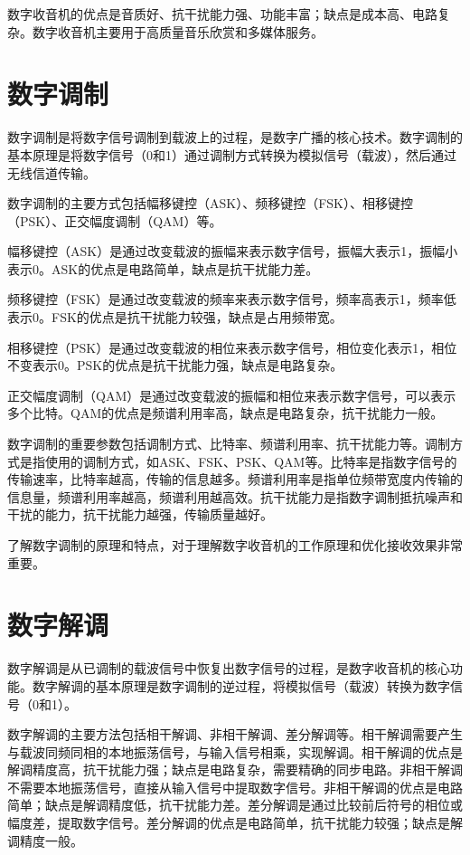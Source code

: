 \documentclass[12pt,UTF8]{ctexbook}
\begin{document}
数字收音机的优点是音质好、抗干扰能力强、功能丰富；缺点是成本高、电路复杂。数字收音机主要用于高质量音乐欣赏和多媒体服务。

\section{数字调制}

数字调制是将数字信号调制到载波上的过程，是数字广播的核心技术。数字调制的基本原理是将数字信号（0和1）通过调制方式转换为模拟信号（载波），然后通过无线信道传输。

数字调制的主要方式包括幅移键控（ASK）、频移键控（FSK）、相移键控（PSK）、正交幅度调制（QAM）等。

幅移键控（ASK）是通过改变载波的振幅来表示数字信号，振幅大表示1，振幅小表示0。ASK的优点是电路简单，缺点是抗干扰能力差。

频移键控（FSK）是通过改变载波的频率来表示数字信号，频率高表示1，频率低表示0。FSK的优点是抗干扰能力较强，缺点是占用频带宽。

相移键控（PSK）是通过改变载波的相位来表示数字信号，相位变化表示1，相位不变表示0。PSK的优点是抗干扰能力强，缺点是电路复杂。

正交幅度调制（QAM）是通过改变载波的振幅和相位来表示数字信号，可以表示多个比特。QAM的优点是频谱利用率高，缺点是电路复杂，抗干扰能力一般。

数字调制的重要参数包括调制方式、比特率、频谱利用率、抗干扰能力等。调制方式是指使用的调制方式，如ASK、FSK、PSK、QAM等。比特率是指数字信号的传输速率，比特率越高，传输的信息越多。频谱利用率是指单位频带宽度内传输的信息量，频谱利用率越高，频谱利用越高效。抗干扰能力是指数字调制抵抗噪声和干扰的能力，抗干扰能力越强，传输质量越好。

了解数字调制的原理和特点，对于理解数字收音机的工作原理和优化接收效果非常重要。

\section{数字解调}

数字解调是从已调制的载波信号中恢复出数字信号的过程，是数字收音机的核心功能。数字解调的基本原理是数字调制的逆过程，将模拟信号（载波）转换为数字信号（0和1）。

数字解调的主要方法包括相干解调、非相干解调、差分解调等。相干解调需要产生与载波同频同相的本地振荡信号，与输入信号相乘，实现解调。相干解调的优点是解调精度高，抗干扰能力强；缺点是电路复杂，需要精确的同步电路。非相干解调不需要本地振荡信号，直接从输入信号中提取数字信号。非相干解调的优点是电路简单；缺点是解调精度低，抗干扰能力差。差分解调是通过比较前后符号的相位或幅度差，提取数字信号。差分解调的优点是电路简单，抗干扰能力较强；缺点是解调精度一般。
\end{document}

